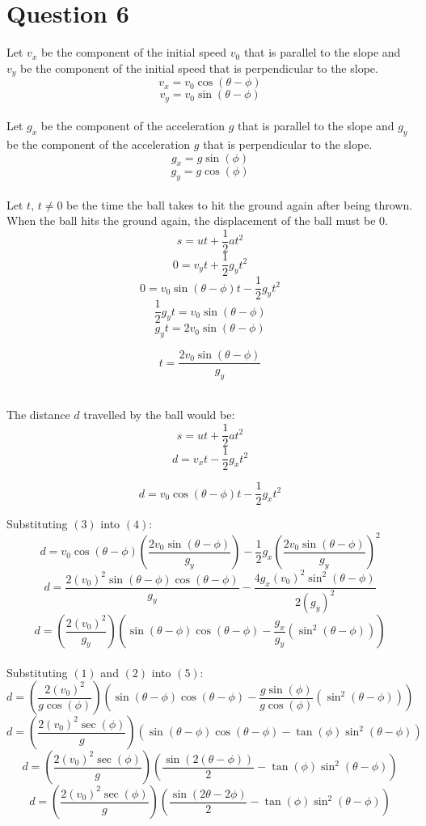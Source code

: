 \documentclass[11pt]{article}
\begin{document}
\section{Question 6}
\label{sec:org832c937}

Let \(v_x\) be the component of the initial speed \(v_0\) that is parallel to the slope and \(v_y\) be the component of the initial speed that is perpendicular to the slope.
\[v_x = v_0 \cos(\theta - \phi)\]
\[v_y = v_0 \sin(\theta - \phi)\]
\\[0pt]

Let \(g_x\) be the component of the acceleration \(g\) that is parallel to the slope and \(g_y\) be the component of the acceleration \(g\) that is perpendicular to the slope.
\[g_x = g \sin(\phi) \tag{1}\]
\[g_y = g \cos(\phi) \tag{2}\]
\\[0pt]

Let \(t, \, t \neq 0\) be the time the ball takes to hit the ground again after being thrown. When the ball hits the ground again, the displacement of the ball must be 0.
\[s = ut + \frac{1}{2}at^2\]
\[0 = v_yt + \frac{1}{2}g_yt^2\]
\[0 = v_0 \sin(\theta - \phi)t - \frac{1}{2}g_yt^2\]
\[\frac{1}{2}g_yt = v_0 \sin(\theta - \phi)\]
\[g_yt = 2v_0 \sin(\theta - \phi)\]

\begin{equation}
t = \frac{2v_0 \sin(\theta - \phi)}{g_y} \tag{3}
\end{equation}
\\[0pt]

\newpage

The distance \(d\) travelled by the ball would be:
\[s = ut + \frac{1}{2}at^2\]
\[d = v_xt - \frac{1}{2}g_xt^2\]

\begin{equation}
d = v_0 \cos(\theta - \phi)t - \frac{1}{2}g_xt^2 \tag{4}
\end{equation}

Substituting \((3)\) into \((4)\):
\[d = v_0 \cos(\theta - \phi)\left(\frac{2v_0 \sin(\theta - \phi)}{g_y}\right) - \frac{1}{2}g_x\left(\frac{2v_0 \sin(\theta - \phi)}{g_y}\right)^2\]
\[d = \frac{2(v_0)^2 \sin(\theta - \phi) \cos(\theta - \phi)}{g_y} - \frac{4g_x(v_0)^2 \sin^2(\theta - \phi)}{2(g_y)^2}\]
\[d = \left(\frac{2(v_0)^2}{g_y}\right) \left(\sin(\theta - \phi) \cos(\theta - \phi) - \frac{g_x}{g_y}(\sin^2(\theta - \phi))\right) \tag{5}\]
\\[0pt]

Substituting \((1)\) and \((2)\) into \((5)\):
\[d = \left(\frac{2(v_0)^2}{g \cos(\phi)}\right) \left(\sin(\theta - \phi) \cos(\theta - \phi) - \frac{g \sin(\phi)}{g \cos(\phi)}(\sin^2(\theta - \phi))\right)\]
\[d = \left(\frac{2(v_0)^2 \sec(\phi)}{g}\right)(\sin(\theta - \phi) \cos(\theta - \phi) - \tan(\phi) \sin^2(\theta - \phi))\]
\[d = \left(\frac{2(v_0)^2 \sec(\phi)}{g}\right) \left(\frac{\sin(2(\theta - \phi))}{2} - \tan(\phi) \sin^2(\theta - \phi)\right)\]
\[d = \left(\frac{2(v_0)^2 \sec(\phi)}{g}\right) \left(\frac{\sin(2\theta - 2\phi)}{2} - \tan(\phi) \sin^2(\theta - \phi)\right)\]
\end{document}
